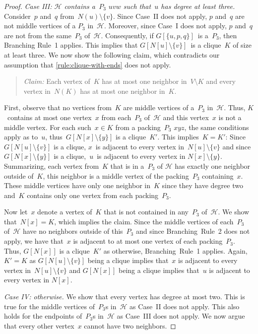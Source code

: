 \documentclass[envcountsame,numbook,smallextended]{svjour3}
\numberwithin{equation}{section}
\numberwithin{figure}{section}
\newcommand{\packing}{\ensuremath{\mathcal H}}
\begin{document}
\begin{proof}
  \emph{Case III: $\packing$ contains a~$P_3$ $uvw$ such that~$u$ has degree at least three.}  
  Consider~$p$ and~$q$ from~$N(u)\setminus \{v\}$.
  Since Case~II does not apply, $p$ and~$q$ are not middle vertices
  of a $P_3$ in~$\packing$.
  Moreover, since Case~I does not apply, 
  $p$ and~$q$ are not from the same~$P_3$ of~$\packing$.
  Consequently, if $G[\{u,p,q\}]$~is a~$P_3$, then Branching Rule~1 applies.
  This implies that $G[N[u]\setminus \{v\}]$~is a clique~$K$ of size at least three.
  We now show the following claim, which contradicts our assumption
  that \cref{rule:clique-with-ends} does not apply.
  \begin{quote}
    \emph{Claim:} Each vertex of~$K$ has at most one neighbor in~$V\setminus K$ and every
    vertex in~$N(K)$ has at most one neighbor in~$K$.
  \end{quote}
  First, observe that no vertices from~$K$ are middle vertices of a~$P_3$
  in~$\packing$. Thus, $K$~contains at most one vertex~$x$ from each~$P_3$ of~$\packing$
  and this vertex~$x$ is not a middle vertex. For each such~$x\in K$ from a packing~$P_3$
  $xyz$, the same conditions apply as to~$u$, thus~$G[N[x]\setminus \{y\}]$ is a
  clique~$K'$. This implies~$K=K'$: Since $G[N[u]\setminus \{v\}]$ is a
  clique, $x$~is adjacent to every vertex in~$N[u]\setminus \{v\}$ and since
  $G[N[x]\setminus \{y\}]$ is a clique,~$u$~is adjacent to every vertex in $N[x]\setminus
  \{y\}$. Summarizing, each vertex from~$K$ that is in a~$P_3$ of $\packing$ has exactly
  one neighbor outside of~$K$, this neighbor is a middle vertex of the packing~$P_3$
  containing~$x$. These middle vertices have only one neighbor in~$K$ since they have
  degree two and~$K$ contains only one vertex from each packing~$P_3$.

  Now let~$x$ denote a vertex of~$K$ that is not contained in any~$P_3$ of~$\packing$. We
  show that~$N[x]=K$, which implies the claim. Since the middle vertices of each~$P_3$
  of~$\packing$ have no neighbors outside of this~$P_3$ and since Branching~Rule~2 does not apply,
  we have that~$x$ is adjacent to at most one vertex of each packing~$P_3$. Thus,
  $G[N[x]]$ is a clique~$K'$ as otherwise, Branching~Rule~1 applies. Again, $K'=K$ as
  $G[N[u]\setminus \{v\}]$ being a clique implies that~$x$ is adjacent to every vertex
  in~$N[u]\setminus \{v\}$ and $G[N[x]]$ being a clique implies that~$u$ is adjacent to
  every vertex in $N[x]$.
 


  \emph{Case IV: otherwise.}
  We show that every vertex has degree at most two.
  This is true for the middle vertices of~$P_3$s in~$\packing$
  as Case~II does not apply.
  This also holds for the endpoints of~$P_3$s in~$\packing$
  as Case~III does not apply.
  We now argue that every other vertex~$x$ cannot have two neighbors. 


\end{proof}
\end{document}
